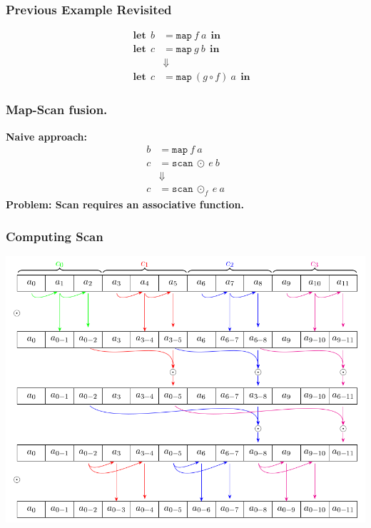 \documentclass{beamer}
\newcommand\lett{\phantom{-}\:\:\mathbf{let}\:\:}
\newcommand\inn{\:\:\mathbf{in}\:\:}
\begin{document}
\begin{frame}
  \frametitle{Previous Example Revisited}
  \begin{align*}
   \lett b &= \mathtt{map} \: f \: a \inn \\
   \lett c &= \mathtt{map} \: g \: b \inn \\
    &\Downarrow \\
    \lett c &= \mathtt{map} \: (g \circ f) \: a \inn 
 \end{align*}
\end{frame}

\begin{frame}
  \frametitle{Map-Scan fusion.}
\large \textbf{Naive approach:}
\begin{align*}
  b &= \mathtt{map} \: f \: a \\
  c &= \mathtt{scan} \: \odot \: e \: b \\
    &\Downarrow \\
  c &= \mathtt{scan} \: \odot_f \: e \: a
\end{align*}
\large \textbf{Problem: Scan requires an associative function.}
\end{frame}


\begin{frame}

 \frametitle{Computing Scan}
 \includegraphics[height=0.7\textheight]{image/monster.png}
\end{frame}
\end{document}
